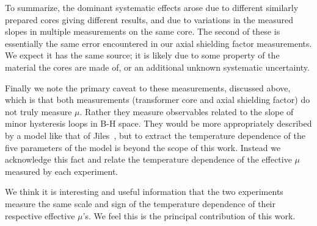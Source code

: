 To summarize, the dominant systematic effects arose due to different
similarly prepared cores giving different results, and due to
variations in the measured slopes in multiple measurements on the same
core.  The second of these is essentially the same error encountered
in our axial shielding factor measurements.  We expect it has the same
source; it is likely due to some property of the material the cores
are made of, or an additional unknown systematic uncertainty.

Finally we note the primary caveat to these measurements, discussed
above, which is that both measurements (transformer core and axial
shielding factor) do not truly measure $\mu$.  Rather they measure
observables related to the slope of minor hysteresis loops in B-H
space.  They would be more appropriately described by a model like
that of Jiles~\cite{bib:jiles}, but to extract the temperature
dependence of the five parameters of the model is beyond the scope of
this work.  Instead we acknowledge this fact and relate the
temperature dependence of the effective $\mu$ measured by each
experiment.

We think it is interesting and useful information that the two
experiments measure the same scale and sign of the temperature
dependence of their respective effective $\mu$'s.  We feel this is the
principal contribution of this work.

